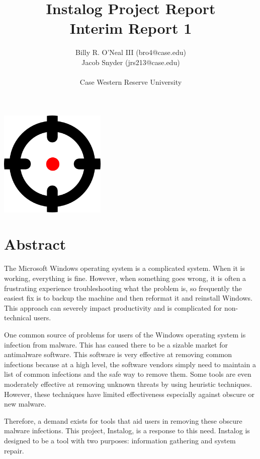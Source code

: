 \documentclass[letterpaper,12pt]{article}
\title{Instalog Project Report \\
Interim Report 1}
\author{
Billy R. O'Neal III (bro4@case.edu) \\
Jacob Snyder (jrs213@case.edu) \\ \\
Case Western Reserve University
}
\begin{document}
\maketitle
\vspace{1in}
\begin{center}
\includegraphics[width=2in, height=2in]{figures/InstalogLogo.png}
\end{center}
\newpage



\tableofcontents
\newpage



\section{Abstract} \label{abstract}
The Microsoft Windows operating system is a complicated system.  When it is
working, everything is fine.  However, when something goes wrong, it is often a
frustrating experience troubleshooting what the problem is, so frequently the
easiest fix is to backup the machine and then reformat it and reinstall Windows.
This approach can severely impact productivity and is complicated for
non-technical users.  

One common source of problems for users of the Windows operating system is
infection from malware.  This has caused there to be a sizable market for
antimalware software.  This software is very effective at removing common
infections because at a high level, the software vendors simply need to maintain
a list of common infections and the safe way to remove them.  Some tools are
even moderately effective at removing unknown threats by using heuristic
techniques.  However, these techniques have limited effectiveness especially
against obscure or new malware.  

Therefore, a demand exists for tools that aid users in removing these obscure
malware infections.  This project, Instalog, is a response to this need. 
Instalog is designed to be a tool with two purposes: information gathering and
system repair.
\end{document}

